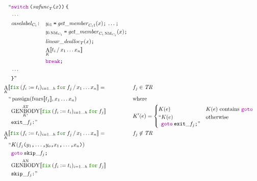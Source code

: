 \documentclass[a4paper,fleqn]{article}
\newcommand{\kwfix}{\mbox{\color{mygreen}\ttfamily fix}}
\newcommand{\kwfor}{\mbox{\color{mygreen}\ttfamily for}}
\newcommand{\fix}[4]{\kwfix\:(#1 := #2)_{#3}\:\kwfor\:#4}
\DeclareMathOperator{\NM}{NM}
\newcommand{\BRA}[1]{\llbracket #1 \rrbracket}
\DeclareMathOperator{\genbody}{GENBODY}
\newcommand{\genbodyat}[2]{\genbody^\mathrm{AT}_{#1}\BRA{#2}}
\newcommand{\genbodyan}[1]{\genbody^\mathrm{AN}\BRA{#1}}
\newcommand{\tr}{\mathit{TR}}
\newcommand{\ldq}{\text{``}}
\newcommand{\rdq}{\text{''}}
\newcommand{\ttparen}[1]{\texttt{(}#1\texttt{)}}
\newcommand{\ttlbrace}{\texttt{\char '173}}
\newcommand{\ttrbrace}{\texttt{\char '175}}
\newcommand{\tteq}{\texttt{=}}
\newcommand{\ttsemi}{\texttt{;}}
\newcommand{\ttcomma}{\texttt{,}}
\newcommand{\ttcolon}{\texttt{:}}
\newcommand{\kwswitch}{\mbox{\color{myviolet}\ttfamily switch}}
\newcommand{\kwbreak}{\mbox{\color{myviolet}\ttfamily break}}
\newcommand{\kwgoto}{\mbox{\color{myviolet}\ttfamily goto}}
\DeclareMathOperator{\passign}{passign}
\DeclareMathOperator{\fvarsop}{fvars}
\newcommand{\fvars}[1]{\fvarsop\BRA{#1}}
\DeclareMathOperator{\Aop}{A}
\newcommand{\A}[3]{\Aop_{#1}\BRA{#2\,/\,#3}}
\begin{document}
\begin{align*}
     & \quad\begin{alignedat}{2}
       \ldq & \kwswitch\:\ttparen{\mathit{swfunc}_T\ttparen{x}}\:\ttlbrace \\
            & \cdots \\
            & \mathit{caselabel}_{C_i}\ttcolon\quad
              \begin{aligned}[t]
              & y_{i1}\:\tteq\:\mathit{get\_member}_{C_i1}(x)\ttsemi \:\ldots\ttsemi \\
              & y_{i\NM_{C_i}}\:\tteq\:\mathit{get\_member}_{C_i\NM_{C_i}}(x)\ttsemi \\
              & \mathit{linear\_dealloc}_{T}(x)\ttsemi \\
              & {\A{K}{t_i}{x_1\ldots x_n}} \\
              & \kwbreak\ttsemi
              \end{aligned} \\
            & \cdots \\
            & \ttrbrace\rdq
       \end{alignedat} \\
  &\A{K}{\fix{f_i}{t_i}{i=1\ldots h}{f_j}}{x_1\ldots x_n} =                   && f_j \in \tr \\
     & \quad\begin{alignedat}[t]{2}
       \ldq & \passign(\fvars{t_j}, x_1\ldots x_n) \\
            & {\genbodyat{K'}{\fix{f_i}{t_i}{i=1\ldots h}{f_j}}} \\
            & \mathtt{exit\_}f_j\ttcolon \rdq
       \end{alignedat} &&
               \begin{alignedat}[t]{1}
                  & \text{where} \\
                  & K'(e) =
                    \begin{cases}
                    K(e) & \text{$K(e)$ contains \kwgoto}  \\
                    \begin{aligned}[t]
                      \ldq & K(e) \\
                           & \kwgoto\:\mathtt{exit\_}f_j\ttsemi \rdq
                    \end{aligned} & \text{otherwise}
                  \end{cases}
                \end{alignedat} \\
  &\A{K}{\fix{f_i}{t_i}{i=1\ldots h}{f_j}}{x_1\ldots x_n} =                      && f_j \not\in \tr \\
     & \quad\begin{alignedat}[t]{2}
       \ldq & K(f_j\ttparen{y_1\ttcomma\dotsc\ttcomma y_o\ttcomma x_1\ttcomma\dotsc\ttcomma x_n})                  \\
            & \kwgoto\:\mathtt{skip\_}f_j\ttsemi                                    \\
            & {\genbodyan{\fix{f_i}{t_i}{i=1\ldots h}{f_j}}}                          \\
            & \mathtt{skip\_}f_j\ttcolon \rdq
       \end{alignedat}
\end{align*}
\end{document}
